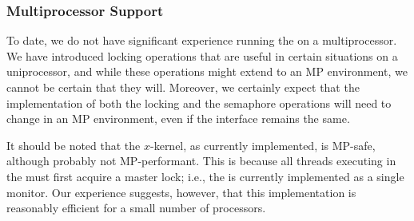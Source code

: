 \subsubsection{Multiprocessor Support}

To date, we do not have significant experience running the \xk{} on a
multiprocessor. We have introduced locking operations that are useful
in certain situations on a uniprocessor, and while these operations
might extend to an MP environment, we cannot be certain that they
will. Moreover, we certainly expect that the implementation of both
the locking and the semaphore operations will need to change in an MP
environment, even if the interface remains the same.

It should be noted that the $x$-kernel, as currently implemented, is
MP-safe, although probably not MP-performant. This is because all
threads executing in the \xk{} must first acquire a master lock; i.e.,
the \xk{} is currently implemented as a single monitor. Our experience
suggests, however, that this implementation is reasonably efficient
for a small number of processors.

